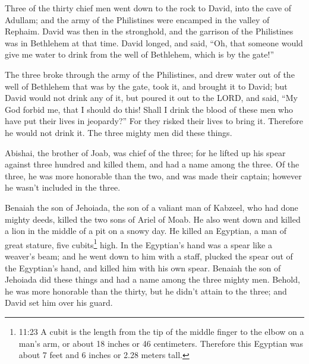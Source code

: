 \myverse{}Three of the thirty chief men went down to the rock to David,
into the cave of Adullam; and the army of the Philistines were encamped in the valley of Rephaim.
\myverse{}David was then in the stronghold, and the garrison of the Philistines was
in Bethlehem at that time.
\myverse{}David longed, and said, “Oh, that someone would give me water to drink from
the well of Bethlehem, which is by the gate!”

\myverse{}The three broke through the army of the Philistines, and drew
water out of the well of Bethlehem that was by the gate, took it, and brought it to David; but David would
not drink any of it, but poured it out to the LORD,
\myverse{}and said, “My God forbid me, that I should do this! Shall I drink the blood
of these men who have put their lives in jeopardy?” For they risked their lives to bring it. Therefore
he would not drink it. The three mighty men did these things.

\myverse{}Abishai, the brother of Joab, was chief of the three; for he
lifted up his spear against three hundred and killed them, and had a name among the three.
\myverse{}Of the three, he was more honorable than the two, and was made their captain;
however he wasn’t included in the three.

\myverse{}Benaiah the son of Jehoiada, the son of a valiant man of Kabzeel,
who had done mighty deeds, killed the two sons of Ariel of Moab. He also went down and killed a lion in
the middle of a pit on a snowy day.
\myverse{}He killed an Egyptian, a man of great stature, five cubits\footnote{11:23 A cubit is the length from the tip of the middle finger to the elbow on a man’s arm, or about
	18 inches or 46 centimeters. Therefore this Egyptian was about 7 feet and 6 inches or 2.28 meters tall.}
high. In the Egyptian’s hand was a spear like a weaver’s beam; and he went down to him with a staff, plucked
the spear out of the Egyptian’s hand, and killed him with his own spear.
\myverse{}Benaiah the son of Jehoiada did these things and had a name among the three
mighty men.
\myverse{}Behold, he was more honorable than the thirty, but he didn’t attain to the
three; and David set him over his guard.

